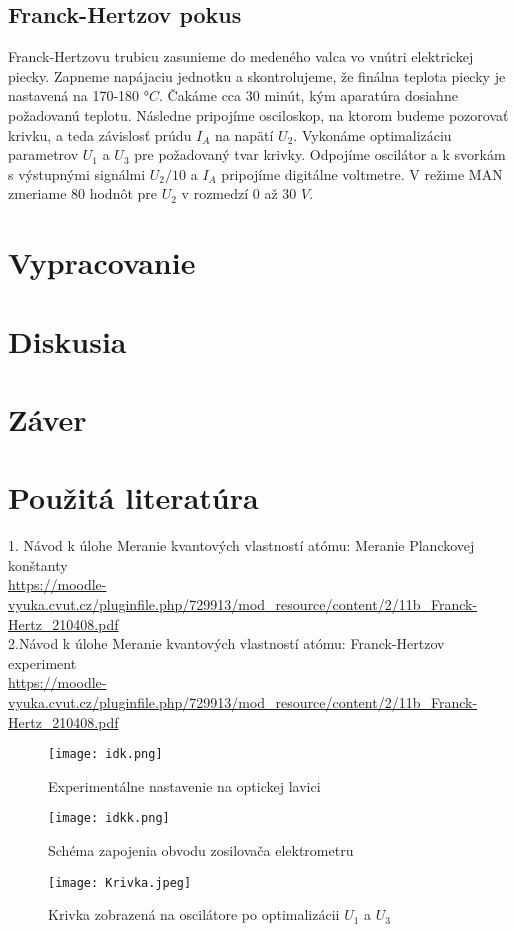 \documentclass{article}
\begin{document}
\subsection{Franck-Hertzov pokus}
Franck-Hertzovu trubicu zasunieme do medeného valca vo vnútri elektrickej piecky. Zapneme napájaciu jednotku a skontrolujeme, že finálna teplota piecky je nastavená na 170-180 $°C$. Čakáme cca 30 minút, kým aparatúra  dosiahne požadovanú teplotu. Následne pripojíme osciloskop, na ktorom budeme pozorovať krivku, a teda závislosť prúdu $I_A$ na napätí $U_2$. Vykonáme optimalizáciu parametrov $U_1$ a $U_3$ pre požadovaný tvar krivky. Odpojíme oscilátor a k svorkám s výstupnými signálmi $U_2/10$ a $I_A$ pripojíme digitálne voltmetre. V režime MAN zmeriame 80 hodnôt pre $U_2$ v rozmedzí 0 až 30 $V$.



\section{Vypracovanie}
\section{Diskusia}
\section{Záver}
\section{Použitá literatúra}
1. Návod k úlohe Meranie kvantových vlastností atómu: Meranie Planckovej konštanty\\
\url{https://moodle-vyuka.cvut.cz/pluginfile.php/729913/mod_resource/content/2/11b_Franck-Hertz_210408.pdf}\\
2.Návod k úlohe Meranie kvantových vlastností atómu: Franck-Hertzov experiment\\
\url{https://moodle-vyuka.cvut.cz/pluginfile.php/729913/mod_resource/content/2/11b_Franck-Hertz_210408.pdf}


\begin{figure}
\centering
\texttt{[image: idk.png]}
\caption{\label{fig:frog}Experimentálne nastavenie na optickej lavici}
\end{figure}
\begin{figure}
\centering
\texttt{[image: idkk.png]}
\caption{\label{fig:frog}Schéma zapojenia obvodu zosilovača elektrometru}
\end{figure}

\begin{figure}
\centering
\texttt{[image: Krivka.jpeg]}
\caption{\label{fig:frog}Krivka zobrazená na oscilátore po optimalizácii $U_1$ a $U_3$}
\end{figure}
\end{document}
